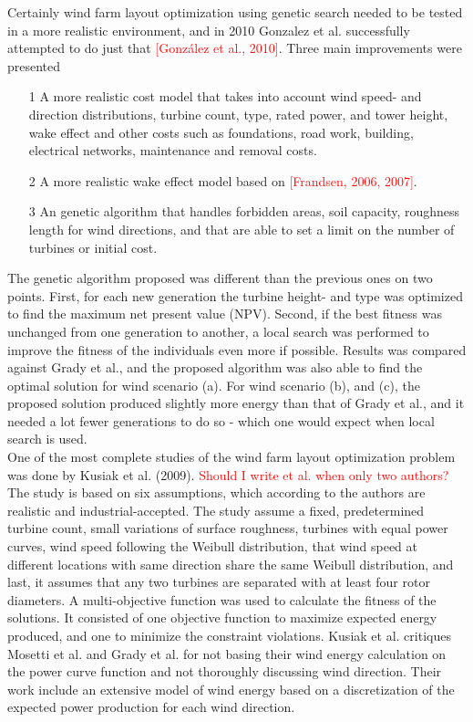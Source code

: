 \noindent Certainly wind farm layout optimization using genetic search needed to be tested in a more realistic environment, and in 2010 Gonzalez et al. successfully attempted to do just that \textcolor{red}{[González et al., 2010]}. Three main improvements were presented

\begin{itemize}
\item[1] A more realistic cost model that takes into account wind speed- and direction distributions, turbine count, type, rated power, and tower height, wake effect and other costs such as foundations, road work, building, electrical networks, maintenance and removal costs.
\item[2] A more realistic wake effect model based on \textcolor{red}{[Frandsen, 2006, 2007]}.
\item[3] An genetic algorithm that handles forbidden areas, soil capacity, roughness length for wind directions, and that are able to set a limit on the number of turbines or initial cost.
\end{itemize}

\noindent The genetic algorithm proposed was different than the previous ones on two points. First, for each new generation the turbine height- and type was optimized to find the maximum net present value (NPV). Second, if the best fitness was unchanged from one generation to another, a local search was performed to improve the fitness of the individuals even more if possible. Results was compared against Grady et al., and the proposed algorithm was also able to find the optimal solution for wind scenario (a). For wind scenario (b), and (c), the proposed solution produced slightly more energy than that of Grady et al., and it needed a lot fewer generations to do so - which one would expect when local search is used.\\


\noindent One of the most complete studies of the wind farm layout optimization problem was done by Kusiak et al. (2009). \textcolor{red}{Should I write et al. when only two authors?} The study is based on six assumptions, which according to the authors are realistic and industrial-accepted. The study assume a fixed, predetermined turbine count, small variations of surface roughness, turbines with equal power curves, wind speed following the Weibull distribution, that wind speed at different locations with same direction share the same Weibull distribution, and last, it assumes that any two turbines are separated with at least four rotor diameters. A multi-objective function was used to calculate the fitness of the solutions. It consisted of one objective function to maximize expected energy produced, and one to minimize the constraint violations. Kusiak et al. critiques Mosetti et al. and Grady et al. for not basing their wind energy calculation on the power curve function and not thoroughly discussing wind direction. Their work include an extensive model of wind energy based on a discretization of the expected power production for each wind direction. \\


